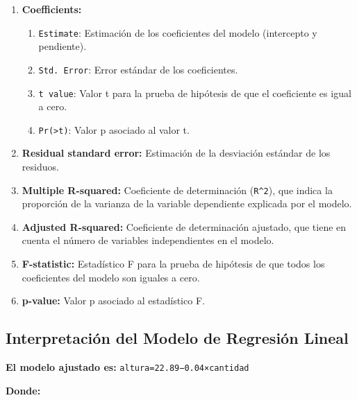 \documentclass[
  spanish,
  a4paper,
  DIV=11,
  numbers=noendperiod,
  onepage,
  openany]{scrreprt}
\begin{document}
\begin{enumerate}
\def\labelenumi{\arabic{enumi}.}
\item
  \textbf{Coefficients:}

  \begin{enumerate}
  \def\labelenumii{\alph{enumii}.}
  \item
    \texttt{Estimate}: Estimación de los coeficientes del modelo
    (intercepto y pendiente).
  \item
    \texttt{Std.\ Error}: Error estándar de los coeficientes.
  \item
    \texttt{t\ value}: Valor t para la prueba de hipótesis de que el
    coeficiente es igual a cero.
  \item
    \texttt{Pr(\textgreater{}\textbar{}t\textbar{})}: Valor p asociado
    al valor t.
  \end{enumerate}
\item
  \textbf{Residual standard error:} Estimación de la desviación estándar
  de los residuos.
\item
  \textbf{Multiple R-squared:} Coeficiente de determinación
  (\texttt{R\^{}2}), que indica la proporción de la varianza de la
  variable dependiente explicada por el modelo.
\item
  \textbf{Adjusted R-squared:} Coeficiente de determinación ajustado,
  que tiene en cuenta el número de variables independientes en el
  modelo.
\item
  \textbf{F-statistic:} Estadístico F para la prueba de hipótesis de que
  todos los coeficientes del modelo son iguales a cero.
\item
  \textbf{p-value:} Valor p asociado al estadístico F.
\end{enumerate}

\subsection{Interpretación del Modelo de Regresión
Lineal}\label{interpretaciuxf3n-del-modelo-de-regresiuxf3n-lineal}

\textbf{El modelo ajustado es:} \texttt{altura=22.89−0.04×cantidad}

\textbf{Donde:}
\end{document}

